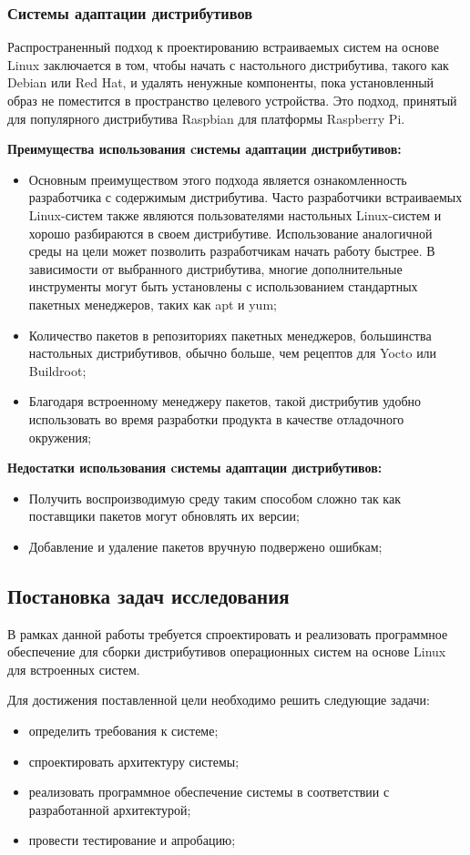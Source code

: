\newpage
\subsubsection{Системы адаптации дистрибутивов}
Распространенный подход к проектированию встраиваемых систем на основе Linux заключается в том, чтобы начать с настольного дистрибутива, такого как Debian или Red Hat, и удалять ненужные компоненты, пока установленный образ не поместится в пространство целевого устройства\cite{ARMBIAN}. Это подход, принятый для популярного дистрибутива Raspbian для платформы Raspberry Pi.

\textbf{Преимущества использования cистемы адаптации дистрибутивов:}
\begin{itemize}
  \item Основным преимуществом этого подхода является ознакомленность разработчика с содержимым дистрибутива. 
Часто разработчики встраиваемых Linux-систем также являются пользователями настольных Linux-систем и хорошо разбираются в своем дистрибутиве. 
Использование аналогичной среды на цели может позволить разработчикам начать работу быстрее.
В зависимости от выбранного дистрибутива, многие дополнительные инструменты могут быть установлены с использованием стандартных пакетных менеджеров, таких как apt и yum;
  \item Количество пакетов в репозиториях пакетных менеджеров, большинства настольных дистрибутивов, обычно больше, чем рецептов для Yocto или Buildroot;
  \item Благодаря встроенному менеджеру пакетов, такой дистрибутив удобно использовать во время разработки продукта в качестве отладочного окружения;
\end{itemize}

\textbf{Недостатки использования cистемы адаптации дистрибутивов:}
\begin{itemize}
  \item Получить воспроизводимую среду таким способом сложно так как поставщики пакетов могут обновлять их версии;
  \item Добавление и удаление пакетов вручную подвержено ошибкам;
\end{itemize}

\newpage
\subsection{Постановка задач исследования}
В рамках данной работы требуется спроектировать и реализовать программное обеспечение для сборки дистрибутивов операционных систем на основе Linux для встроенных систем.

Для достижения поставленной цели необходимо решить следующие задачи:
\begin{itemize}
  \item определить требования к системе;
  \item спроектировать архитектуру системы;
  \item реализовать программное обеспечение системы в соответствии с разработанной архитектурой;
  \item провести тестирование и апробацию;
\end{itemize}
\newpage
